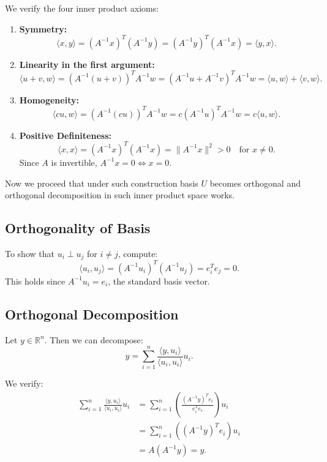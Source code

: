 \documentclass{article}
\begin{document}
We verify the four inner product axioms:

\begin{enumerate}
  \item \textbf{Symmetry:}
  \[
  \langle x, y \rangle = (A^{-1}x)^T (A^{-1}y) = (A^{-1}y)^T (A^{-1}x) = \langle y, x \rangle.
  \]

  \item \textbf{Linearity in the first argument:}
  \[
  \langle u+v, w \rangle = (A^{-1}(u+v))^T A^{-1}w = (A^{-1}u + A^{-1}v)^T A^{-1}w = \langle u, w \rangle + \langle v, w \rangle.
  \]

  \item \textbf{Homogeneity:}
  \[
  \langle cu, w \rangle = (A^{-1}(cu))^T A^{-1}w = c (A^{-1}u)^T A^{-1}w = c \langle u, w \rangle.
  \]

  \item \textbf{Positive Definiteness:}
  \[
  \langle x, x \rangle = (A^{-1}x)^T (A^{-1}x) = \|A^{-1}x\|^2 > 0 \quad \text{for } x \ne 0.
  \]
  Since \( A \) is invertible, \( A^{-1}x = 0 \iff x = 0 \).
\end{enumerate}

Now we proceed that under such construction basis $U$ becomes orthogonal and orthogonal decomposition in such inner product space works.

\subsection*{Orthogonality of Basis}

To show that \( u_i \perp u_j \) for \( i \ne j \), compute:
\[
\langle u_i, u_j \rangle = (A^{-1}u_i)^T (A^{-1}u_j) = e_i^T e_j = 0.
\]
This holds since \( A^{-1}u_i = e_i \), the standard basis vector.

\subsection*{Orthogonal Decomposition}

Let \( y \in \mathbb{R}^n \). Then we can decompose:
\[
y = \sum_{i=1}^n \frac{\langle y, u_i \rangle}{\langle u_i, u_i \rangle} u_i.
\]

We verify:
\begin{align*}
  \sum_{i=1}^n \frac{\langle y, u_i \rangle}{\langle u_i, u_i \rangle} u_i
  &= \sum_{i=1}^n \left( \frac{(A^{-1}y)^T e_i}{e_i^T e_i} \right) u_i \\
  &= \sum_{i=1}^n ((A^{-1}y)^T e_i) u_i \\
  &= A (A^{-1} y) = y.
\end{align*}
\end{document}
